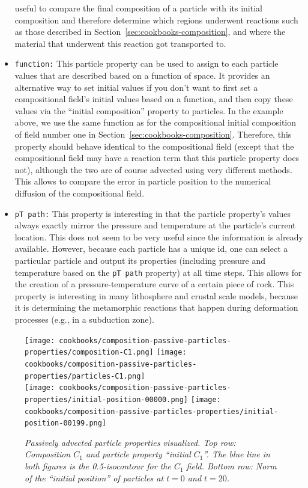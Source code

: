 \documentclass{article}
\begin{document}
\begin{itemize}
  useful to compare the final composition of a particle with its
  initial composition and therefore determine which regions underwent
  reactions such as those described in Section~\ref{sec:cookbooks-composition},
  and where the material that underwent this reaction got transported
  to. 
\item \texttt{function:} This particle property can be used to assign
  to each particle values that are described based on a function of
  space. It provides an alternative way to set initial values if you
  don't want to first set a compositional field's initial values based
  on a function, and then copy these values via the ``initial
  composition'' property to particles. In the example above, we use
  the same function as for the compositional initial composition of
  field number one in
  Section~\ref{sec:cookbooks-composition}. Therefore, this property
  should behave identical to the compositional field (except that the
  compositional field may have a reaction term that this particle
  property does not), although the two are of course advected using
  very different methods. This allows to compare the error in particle
  position to the numerical diffusion of the compositional field.
\item \texttt{pT path:} This property is interesting in that the
  particle property's values always exactly mirror the pressure and
  temperature at the particle's current location. This does not seem
  to be very useful since the information is already
  available. However, because each particle has a unique id, one can
  select a particular particle and output its properties
  (including pressure and temperature based on the \texttt{pT path}
  property) at all time steps. This allows for the creation of a pressure-temperature curve of a certain piece of rock. This property is interesting in many lithosphere and crustal scale models, because it is determining the metamorphic reactions that happen during deformation processes (e.g., in a subduction zone).
\end{itemize}

\begin{figure}
  \centering
  \phantom{.}
  \hfill
  \texttt{[image: cookbooks/composition-passive-particles-properties/composition-C1.png]}
  \hfill
  \texttt{[image: cookbooks/composition-passive-particles-properties/particles-C1.png]}
  \phantom{.}
  \\
  \phantom{.}
  \hfill
  \texttt{[image: cookbooks/composition-passive-particles-properties/initial-position-00000.png]}
  \hfill
  \texttt{[image: cookbooks/composition-passive-particles-properties/initial-position-00199.png]}
  \phantom{.}
  \caption{\it Passively advected particle properties visualized. Top row:
  Composition $C_1$ and particle property ``initial $C_1$''. The blue line in both
  figures is the 0.5-isocontour for the $C_1$ field. Bottom row: Norm of the
  ``initial position'' of particles at $t=0$ and $t=20$.}
  \label{fig:composition-passive-particles-properties}
\end{figure}
\end{document}
